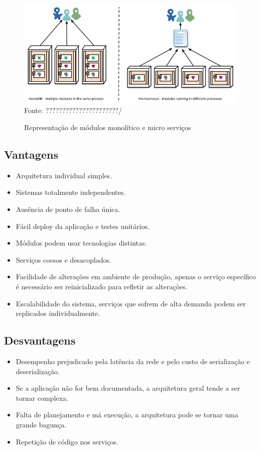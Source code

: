 \begin{figure}[!htpb]
	\centering
	\caption{Representação de módulos monolítico e micro serviços}
	\includegraphics[width=15cm]{images/micro-deployment.png}\\
	Fonte: ??????????????????????/
 	\label{f_c2_app_monolitica_vs_microservices}
\end{figure}

\subsection*{Vantagens}
\begin{itemize}
	\item Arquitetura individual simples.
	\item Sistemas totalmente independentes.
	\item Ausência de ponto de falha única.
	\item Fácil deploy da aplicação e testes unitários.
	\item Módulos podem usar tecnologias distintas.
	\item Serviços coesos e desacoplados.
	\item Facilidade de alterações em ambiente de produção, apenas o serviço específico é necessário ser reinicializado para refletir as alterações.
	\item Escalabilidade do sistema, serviços que sofrem de alta demanda podem ser replicados individualmente.
\end{itemize}

\subsection*{Desvantagens}
\begin{itemize}
	\item Desempenho prejudicado pela latência da rede e pelo custo de serialização e deserialização.
	\item Se a aplicação não for bem documentada, a arquitetura geral tende a ser tornar complexa.
	\item Falta de planejamento e má execução, a arquitetura pode se tornar uma grande bagunça.
	\item Repetição de código nos serviços.
\end{itemize}

